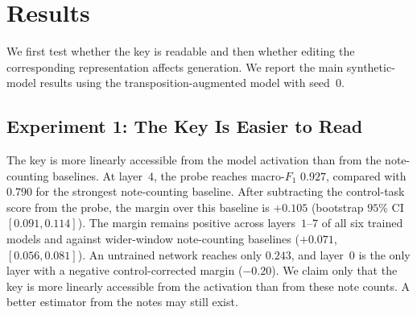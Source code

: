 \documentclass{article}
\begin{document}
\section{Results}
\label{sec:results}
We first test whether the key is readable and then whether editing the corresponding representation affects generation.
We report the main synthetic-model results using the transposition-augmented model with seed~$0$.

\subsection{Experiment 1: The Key Is Easier to Read}
\label{sec:h1}
The key is more linearly accessible from the model activation than from the note-counting baselines.
At layer~$4$, the probe reaches macro-$F_1$ $0.927$, compared with $0.790$ for the strongest note-counting baseline.
After subtracting the control-task score from the probe, the margin over this baseline is $+0.105$ (bootstrap $95\%$ CI $[0.091,0.114]$).
The margin remains positive across layers~$1$--$7$ of all six trained models and against wider-window note-counting baselines ($+0.071$, $[0.056,0.081]$).
An untrained network reaches only $0.243$, and layer~$0$ is the only layer with a negative control-corrected margin ($-0.20$).
We claim only that the key is more linearly accessible from the activation than from these note counts.
A better estimator from the notes may still exist.
\end{document}
